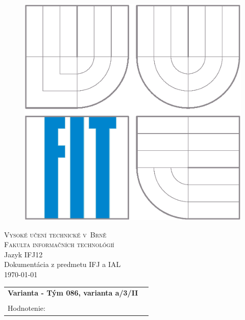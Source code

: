 \begin{titlepage}

\begin{figure}[h]
\begin{center}
\includegraphics[scale=0.6]{logo.eps}
\end{center}
\end{figure}

\begin{center}
\LARGE
\textsc{Vysoké učení
  technické v~Brně\\ \Large{Fakulta informačních technológií}}\\
\LARGE
Jazyk IFJ12 \\
\Huge
Dokumentácia z predmetu IFJ a IAL\\ 
\large{\medskip
\today }\\
\end{center}
 \hfill   

\begin{flushleft}
\begin{large}
\begin{tabular}{ll}
\textbf{Varianta - Tým 086, varianta a/3/II} \\ \\
Hodnotenie: \\


\end{tabular}
\end{large}
\end{flushleft}
\end{titlepage}
